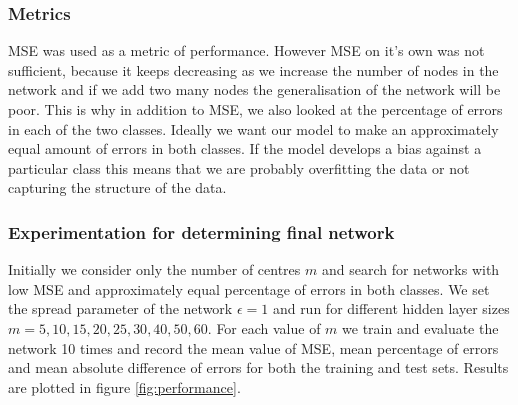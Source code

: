\documentclass[a4paper, 11pt]{article}
\begin{document}
\subsubsection{Metrics}
MSE was used as a metric of performance. However MSE on it's own was not sufficient, because it keeps decreasing as we increase the number of nodes in the network and if we add two many nodes the generalisation of the network will be poor. This is why in addition to MSE, we also looked at the percentage of errors in each of the two classes. Ideally we want our model to make an approximately equal amount of errors in both classes. If the model develops a bias against a particular class this means that we are probably overfitting the data or not capturing the structure of the data.



\subsubsection{Experimentation for determining final network}
Initially we consider only the number of centres $m$ and search for networks with low MSE and approximately equal percentage of errors in both classes. We set the spread parameter of the network $\epsilon = 1$ and run for different hidden layer sizes $m = 5, 10, 15, 20, 25, 30, 40, 50, 60$. For each value of $m$ we train and evaluate the network 10 times and record the mean value of MSE, mean percentage of errors and mean absolute difference of errors for both the training and test sets. Results are plotted in figure \ref{fig:performance}.
\end{document}
